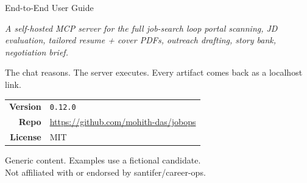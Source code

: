 \documentclass[11pt,letterpaper]{article}
\begin{document}
\begin{titlepage}
\centering
\vspace*{2cm}
\vspace{0.8em}

{\Large\sffamily End-to-End User Guide\par}
\vspace{2.2em}

\begin{minipage}{0.82\textwidth}
\centering\itshape\large
A self-hosted MCP server for the full job-search loop \textemdash{} portal scanning, JD evaluation, tailored resume + cover PDFs, outreach drafting, story bank, negotiation brief.

\medskip
\normalsize\upshape\sffamily
The chat reasons. The server executes. Every artifact comes back as a localhost link.
\end{minipage}

\vfill

\vspace{0.6em}

\begin{tabular}{rl}
\textsf{\small\bfseries Version} & \texttt{0.12.0} \\
\textsf{\small\bfseries Repo}    & \url{https://github.com/mohith-das/jobops} \\
\textsf{\small\bfseries License} & MIT \\
\end{tabular}

\vspace{1em}
{\footnotesize\sffamily\color{black!55}
Generic content. Examples use a fictional candidate.\\
Not affiliated with or endorsed by santifer/career-ops.}
\end{titlepage}

\tableofcontents
\thispagestyle{fancy}
\clearpage

\end{document}
